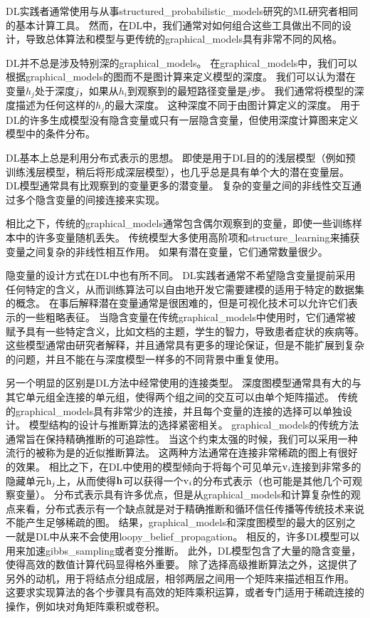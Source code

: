 \gls{DL}实践者通常使用与从事\gls{structured_probabilistic_models}研究的\gls{ML}研究者相同的基本计算工具。
然而，在\gls{DL}中，我们通常对如何组合这些工具做出不同的设计，导致总体算法和模型与更传统的\gls{graphical_models}具有非常不同的风格。


\gls{DL}并不总是涉及特别深的\gls{graphical_models}。
在\gls{graphical_models}中，我们可以根据\gls{graphical_models}的图而不是图计算来定义模型的深度。
我们可以认为潜在变量$h_j$处于深度$j$，如果从$h_i$到观察到的最短路径变量是$j$步。
我们通常将模型的深度描述为任何这样的$h_j$的最大深度。 
这种深度不同于由图计算定义的深度。
用于\gls{DL}的许多生成模型没有隐含变量或只有一层隐含变量，但使用深度计算图来定义模型中的条件分布。


\gls{DL}基本上总是利用分布式表示的思想。
即使是用于\gls{DL}目的的浅层模型（例如预训练浅层模型，稍后将形成深层模型），也几乎总是具有单个大的潜在变量层。
\gls{DL}模型通常具有比观察到的变量更多的潜变量。
复杂的变量之间的非线性交互通过多个隐含变量的间接连接来实现。


相比之下，传统的\gls{graphical_models}通常包含偶尔观察到的变量，即使一些训练样本中的许多变量随机丢失。
传统模型大多使用高阶项和\gls{structure_learning}来捕获变量之间复杂的非线性相互作用。
如果有潜在变量，它们通常数量很少。



隐变量的设计方式在\gls{DL}中也有所不同。
\gls{DL}实践者通常不希望隐含变量提前采用任何特定的含义，从而训练算法可以自由地开发它需要建模的适用于特定的数据集的概念。
在事后解释潜在变量通常是很困难的，但是可视化技术可以允许它们表示的一些粗略表征。
当隐含变量在传统\gls{graphical_models}中使用时，它们通常被赋予具有一些特定含义，比如文档的主题，学生的智力，导致患者症状的疾病等。
这些模型通常由研究者解释，并且通常具有更多的理论保证，但是不能扩展到复杂的问题，并且不能在与深度模型一样多的不同背景中重复使用。


另一个明显的区别是\gls{DL}方法中经常使用的连接类型。
深度图模型通常具有大的与其它单元组全连接的单元组，使得两个组之间的交互可以由单个矩阵描述。
传统的\gls{graphical_models}具有非常少的连接，并且每个变量的连接的选择可以单独设计。
模型结构的设计与推断算法的选择紧密相关。
\gls{graphical_models}的传统方法通常旨在保持精确推断的可追踪性。
当这个约束太强的时候，我们可以采用一种流行的被称为是的近似推断算法。
这两种方法通常在连接非常稀疏的图上有很好的效果。
相比之下，在\gls{DL}中使用的模型倾向于将每个可见单元$\mathrm{v}_i$连接到非常多的隐藏单元$\mathrm{h}_j$上，从而使得$\mathbf{h}$可以获得一个$\mathrm{v}_i$的分布式表示（也可能是其他几个可观察变量）。
分布式表示具有许多优点，但是从\gls{graphical_models}和计算复杂性的观点来看，分布式表示有一个缺点就是对于精确推断和循环信任传播等传统技术来说不能产生足够稀疏的图。
结果，\gls{graphical_models}和深度图模型的最大的区别之一就是\gls{DL}中从来不会使用\gls{loopy_belief_propagation}。
相反的，许多\gls{DL}模型可以用来加速\gls{gibbs_sampling}或者变分推断。
此外，\gls{DL}模型包含了大量的隐含变量，使得高效的数值计算代码显得格外重要。
除了选择高级推断算法之外，这提供了另外的动机，用于将结点分组成层，相邻两层之间用一个矩阵来描述相互作用。
这要求实现算法的各个步骤具有高效的矩阵乘积运算，或者专门适用于稀疏连接的操作，例如块对角矩阵乘积或卷积。



